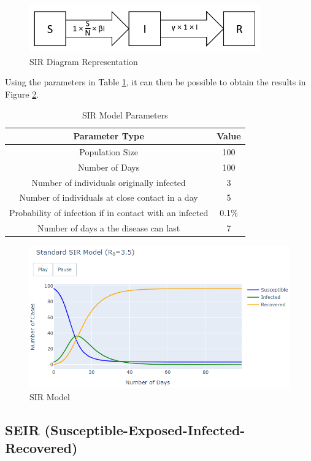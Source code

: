 \begin{figure}[ht!]%
    \centering
    \includegraphics[width=10cm]{latex/images/dsir.PNG}%
    \caption{SIR Diagram Representation}
    \label{dsir}
\end{figure}

Using the parameters in Table \ref{table:1}, it can then be possible to obtain the results in Figure \ref{sir}.

{
\begin{table}[h!]
\centering
\begin{tabular}{|c|c|}
\hline
Parameter Type & Value \\
\hline
Population Size & 100  \\
Number of Days & 100  \\
Number of individuals originally infected & 3  \\
Number of individuals at close contact in a day & 5 \\
Probability of infection if in contact with an infected & 0.1\% \\
Number of days a the disease can last & 7 \\
\hline
\end{tabular}
\caption{SIR Model Parameters}
\label{table:1}
\end{table}
}


\begin{figure}[ht!]%
    \centering
    \includegraphics[width=13cm]{latex/images/sir.PNG}%
    \caption{SIR Model}
    \label{sir}
\end{figure}

\subsection{SEIR (Susceptible-Exposed-Infected-Recovered)}

